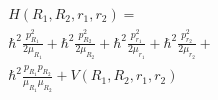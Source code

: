%
%

\begin{multline}
        H(R_1, R_2, r_1, r_2) =\\
          \hbar^{2}  \frac{p_{R_1}^2}{2 \mu_{R_1}} + \hbar^{2} \frac{p_{R_2}^2}{2 \mu_{R_2}} +
            \hbar^{2} \frac{p_{r_1}^2}{2 \mu_{r_1}} + \hbar^{2} \frac{p_{r_2}^2}{2 \mu_{r_2}} + \\
            \hbar^{2} \frac{p_{R_1}p_{R_2}}{\mu_{R_1}\mu_{R_2}}+ V(R_1, R_2, r_1, r_2)
\label{eq:baseHam}
\end{multline}

%
